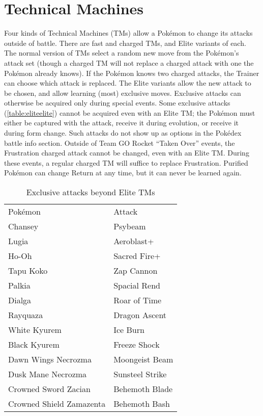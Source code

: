 



\section{Technical Machines\label{sec:tms}}
Four kinds of Technical Machines (TMs) allow a Pokémon to change its attacks outside of battle.
There are fast and charged TMs, and Elite variants of each.
The normal version of TMs select a random new move from the Pokémon's attack set (though a charged TM will not replace
 a charged attack with one the Pokémon already knows).
If the Pokémon knows two charged attacks, the Trainer can choose which attack is replaced.
The Elite variants allow the new attack to be chosen, and allow learning (most) exclusive moves.
Exclusive attacks can otherwise be acquired only during special events.
Some exclusive attacks (\autoref{table:eliteelite}) cannot be acquired even
 with an Elite TM; the Pokémon must either be captured with the attack, receive
 it during evolution, or receive it during form change.
Such attacks do not show up as options in the Pokédex battle info section.
Outside of Team GO Rocket ``Taken Over'' events, the Frustration charged attack cannot be
 changed, even with an Elite TM\@.
During these events, a regular charged TM will suffice to replace Frustration.
Purified Pokémon can change Return at any time, but it can never be learned again.
\begin{table}[hb]
\centering%
\begin{tabular}{ll}
Pokémon & Attack\\
\Midrule
Chansey                 & Psybeam\\
Lugia                   & Aeroblast+\\
Ho-Oh                   & Sacred Fire+\\
Tapu Koko               & Zap Cannon\\
Palkia                  & Spacial Rend\\
Dialga                  & Roar of Time\\
Rayquaza                & Dragon Ascent\\
White Kyurem            & Ice Burn\\
Black Kyurem            & Freeze Shock\\
Dawn Wings Necrozma     & Moongeist Beam\\
Dusk Mane Necrozma      & Sunsteel Strike\\
Crowned Sword Zacian    & Behemoth Blade\\
Crowned Shield Zamazenta& Behemoth Bash\\
\end{tabular}
\caption{Exclusive attacks beyond Elite TMs\label{table:eliteelite}}
\end{table}

